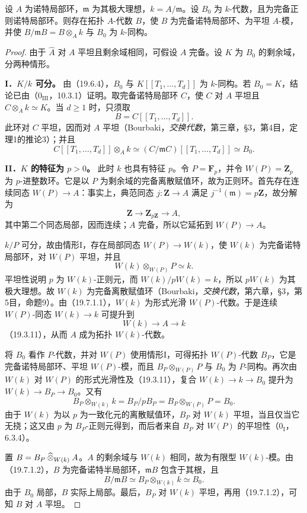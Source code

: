 设 $A$ 为诺特局部环，$\mathfrak m$ 为其极大理想，$k=A/\mathfrak m$。设 $B_0$ 为 $k$-代数，且为完备正则诺特局部环。则存在拓扑 $A$-代数 $B$，使 $B$ 为完备诺特局部环、为平坦 $A$-模，并使 $B/\mathfrak mB=B\otimes_Ak$ 与 $B_0$ 为 $k$-同构。

\begin{proof}
由于 $\widehat A$ 对 $A$ 平坦且剩余域相同，可假设 $A$ 完备。设 $K$ 为 $B_0$ 的剩余域，分两种情形。

\noindent\textbf{I．$K/k$ 可分。}
由（19.6.4），$B_0$ 与 $K[[T_1,\ldots,T_d]]$ 为 $k$-同构。若 $B_0=K$，结论已由（$0_{\mathrm{III}}$，10.3.1）证明。取完备诺特局部环 $C$，使 $C$ 对 $A$ 平坦且 $C\otimes_Ak\simeq K$。当 $d\ge1$ 时，只须取
\[
 B=C[[T_1,\ldots,T_d]].
\]
此环对 $C$ 平坦，因而对 $A$ 平坦（Bourbaki，\textit{交换代数}，第三章，§3，第4目，定理1的推论3）；并且
\[
 C[[T_1,\ldots,T_d]]\otimes_Ak
 \simeq(C/\mathfrak mC)[[T_1,\ldots,T_d]]\simeq B_0.
\]

\noindent\textbf{II．$K$ 的特征为 $p>0$。}
此时 $k$ 也具有特征 $p$。令 $P=\mathbf F_p$，并令 $W(P)=\mathbf Z_p$ 为 $p$-进整数环。它是以 $P$ 为剩余域的完备离散赋值环，故为正则环。首先存在连续同态 $W(P)\to A$：事实上，典范同态 $j:\mathbf Z\to A$ 满足 $j^{-1}(\mathfrak m)=p\mathbf Z$，故分解为
\[
 \mathbf Z\longrightarrow\mathbf Z_{p\mathbf Z}\longrightarrow A,
\]
其中第二个同态局部，因而连续；$A$ 完备，所以它延拓到 $W(P)\to A$。

$k/P$ 可分，故由情形I，存在局部同态 $W(P)\to W(k)$，使 $W(k)$ 为完备诺特局部环，对 $W(P)$ 平坦，并且
\[
 W(k)\otimes_{W(P)}P\simeq k.
\]
平坦性说明 $p$ 为 $W(k)$-正则元，而 $W(k)/pW(k)=k$，所以 $pW(k)$ 为其极大理想。故 $W(k)$ 为完备离散赋值环（Bourbaki，\textit{交换代数}，第六章，§3，第5目，命题9）。由（19.7.1.1），$W(k)$ 为形式光滑 $W(P)$-代数。于是连续 $W(P)$-同态 $W(k)\to k$ 可提升到
\[
 W(k)\longrightarrow A\longrightarrow k
\]
（19.3.11），从而 $A$ 成为拓扑 $W(k)$-代数。

将 $B_0$ 看作 $P$-代数，并对 $W(P)$ 使用情形I，可得拓扑 $W(P)$-代数 $B_P$，它是完备诺特局部环、平坦 $W(P)$-模，而且 $B_P\otimes_{W(P)}P$ 与 $B_0$ 为 $P$-同构。再次由 $W(k)$ 对 $W(P)$ 的形式光滑性及（19.3.11），复合 $W(k)\to k\to B_0$ 提升为 $W(k)\to B_P\to B_0$。又有
\[
 B_P\otimes_{W(k)}k=B_P/pB_P=B_P\otimes_{W(P)}P=B_0.
\]
由于 $W(k)$ 为以 $p$ 为一致化元的离散赋值环，$B_P$ 对 $W(k)$ 平坦，当且仅当它无挠；这又由 $p$ 为 $B_P$-正则元得到，而后者来自 $B_P$ 对 $W(P)$ 的平坦性（$0_{\mathrm I}$，6.3.4）。

置 $B=B_P\mathbin{\widehat{\otimes}}_{W(k)}A$。$A$ 的剩余域与 $W(k)$ 相同，故为有限型 $W(k)$-模。由（19.7.1.2），$B$ 为完备诺特半局部环，$\mathfrak mB$ 包含于其根，且
\[
 B/\mathfrak mB\simeq B_P\otimes_{W(k)}k\simeq B_0.
\]
由于 $B_0$ 局部，$B$ 实际上局部。最后，$B_P$ 对 $W(k)$ 平坦，再用（19.7.1.2），可知 $B$ 对 $A$ 平坦。
\end{proof}


